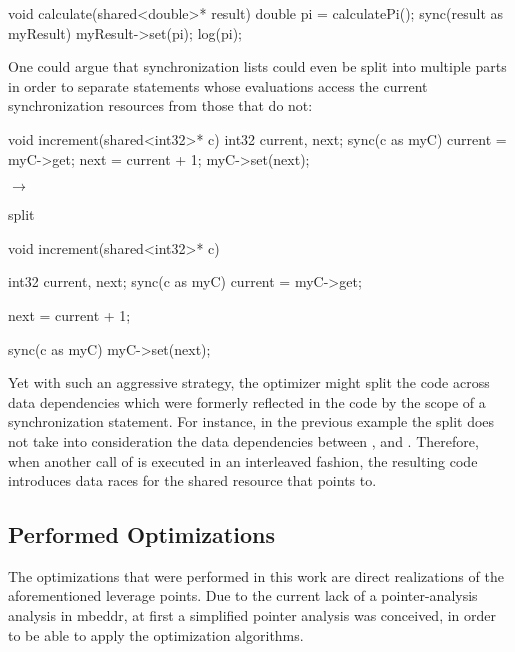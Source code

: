 \begin{ccode}
void calculate(shared<double>* result) {
  double pi = calculatePi();
  sync(result as myResult) { myResult->set(pi); }
  log(pi);
}
\end{ccode}

One could argue that synchronization lists could even be split into multiple parts in order to separate statements whose evaluations access the current synchronization resources from those that do not:

\begin{minipage}{0.35\textwidth}
\begin{ccode}
void increment(shared<int32>* c) {
  int32 current, next;
  sync(c as myC) {
    current = myC->get;
    next = current + 1;
    myC->set(next);
  }
}
\end{ccode}
\end{minipage}
\begin{minipage}{0.2\textwidth}
\begin{center}
$\longrightarrow$

split
\end{center}
\end{minipage}
\begin{minipage}{0.4\textwidth}
\begin{ccode}
void increment(shared<int32>* c) {
  int32 current, next;
  sync(c as myC) { current = myC->get; }
  
  next = current + 1;

  sync(c as myC) { myC->set(next); }
}
\end{ccode}
\end{minipage}

Yet with such an aggressive strategy, the optimizer might split the code across data dependencies which were formerly reflected in the code by the scope of a synchronization statement. For instance, in the previous example the split does not take into consideration the data dependencies between ,  and . Therefore, when another call of  is executed in an interleaved fashion, the resulting code introduces data races for the shared resource that  points to.

\subsection{Performed Optimizations}
The optimizations that were performed in this work are direct realizations of the aforementioned leverage points. Due to the current lack of a pointer-analysis analysis in mbeddr, at first a simplified pointer analysis was conceived, in order to be able to apply the optimization algorithms.

